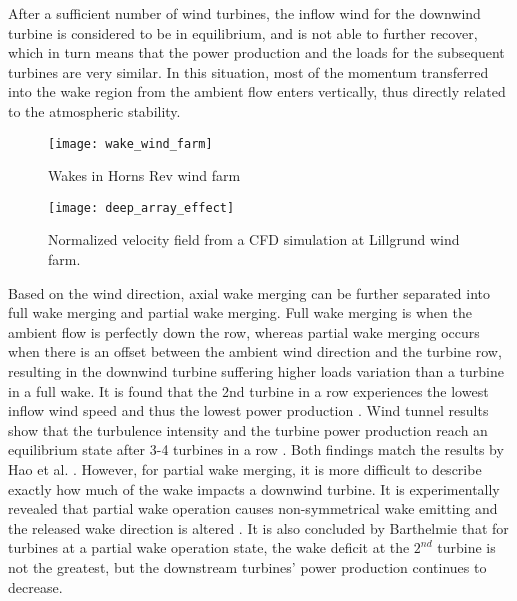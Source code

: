 \documentclass{umthesis}
\begin{document}
After a sufficient number of wind turbines, the inflow wind for the downwind turbine is considered to be in equilibrium, and is not able to further recover, which in turn means that the power production and the loads for the subsequent turbines are very similar. In this situation, most of the momentum transferred into the wake region from the ambient flow enters vertically, thus directly related to the atmospheric stability.

\begin{figure}
  \centering
  \texttt{[image: wake\_wind\_farm]}
  \caption{Wakes in Horns Rev wind farm}\label{fig:wake_wind_farm}
\end{figure}

\begin{figure}
  \centering
  \texttt{[image: deep\_array\_effect]}
  \caption{Normalized velocity field from a CFD simulation at Lillgrund wind farm.}\label{fig:deep_array_effect}
\end{figure}

Based on the wind direction, axial wake merging can be further separated into full wake merging and partial wake merging. Full wake merging is when the ambient flow is perfectly down the row, whereas partial wake merging occurs when there is an offset between the ambient wind direction and the turbine row, resulting in the downwind turbine suffering higher loads variation than a turbine in a full wake. It is found that the 2nd turbine in a row experiences the lowest inflow wind speed and thus the lowest power production \cite{Schepers_2009}. Wind tunnel results show that the turbulence intensity and the turbine power production reach an equilibrium state after 3-4 turbines in a row \cite{Vermeulen_1982}. Both findings match the results by Hao et al. \cite{Hao}. However, for partial wake merging, it is more difficult to describe exactly how much of the wake impacts a downwind turbine. It is experimentally revealed that partial wake operation causes non-symmetrical wake emitting and the released wake direction is altered \cite{Troldborg_2011}. It is also concluded by Barthelmie \cite{Meteorological_controls} that for turbines at a partial wake operation state, the wake deficit at the $2^{nd}$ turbine is not the greatest, but the downstream turbines' power production continues to decrease.
\end{document}
